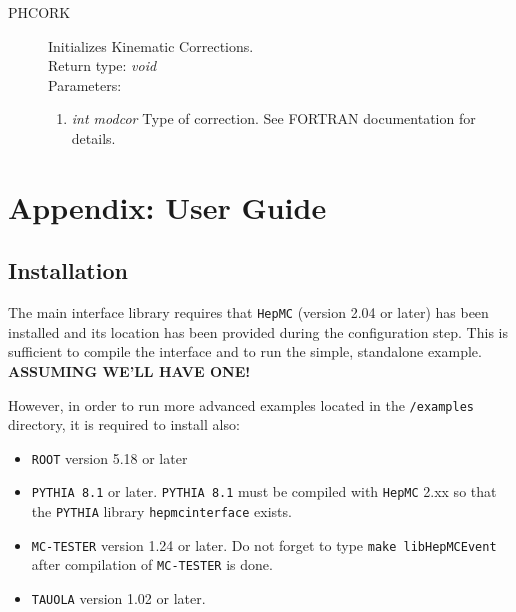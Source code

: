\documentclass[]{Photos_interface_design}
\begin{document}
\begin{description}
\item[PHCORK] Initializes Kinematic Corrections. \\
  Return type: \textit{void} \\
  Parameters:
  \begin{enumerate}
    \item \textit {int modcor} Type of correction. See FORTRAN documentation for details.
  \end{enumerate}
\end{description}

\section{Appendix: User Guide}
\label{sec:User Guide}

\subsection{Installation}
\label{sec:Installation}
The main interface library requires that {\tt HepMC} \cite{Dobbs:2001ck} (version 2.04 or later)  has been installed
and its location has been provided during the configuration step. This is sufficient to compile the interface and to run the simple, standalone example.
{\bf ASSUMING WE'LL HAVE ONE!}

However, in order to run more advanced examples located in the {\tt /examples} directory, it is required to install also:

\begin{itemize}
  \item {\tt ROOT} \cite{root-install-www} version 5.18 or later
  \item {\tt PYTHIA 8.1} \cite{Sjostrand:2007gs} or later. {\tt PYTHIA 8.1} must be compiled with {\tt HepMC} 2.xx
        so that the {\tt PYTHIA} library {\tt hepmcinterface} exists.
  \item {\tt MC-TESTER} \cite{Golonka:2002rz,Davidson:2008ma} version 1.24 or later.
        Do not forget to type {\tt make libHepMCEvent} after compilation of {\tt MC-TESTER} is done.
  \item {\tt TAUOLA} \cite{Davidson:2010rw} version 1.02 or later.
\end{itemize}
\end{document}
